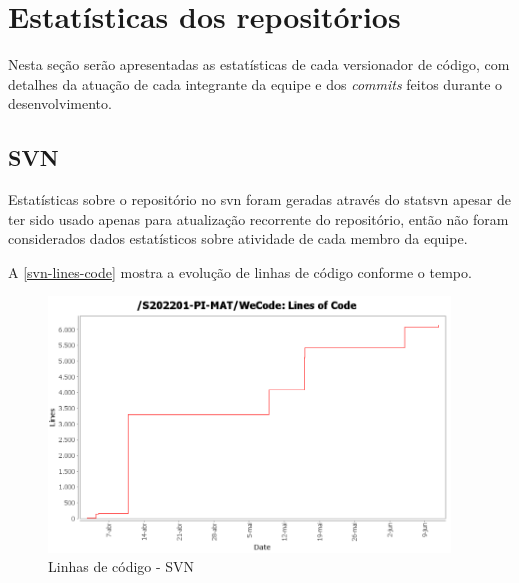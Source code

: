 \section{Estatísticas dos repositórios}
Nesta seção serão apresentadas as estatísticas de cada versionador de código, com detalhes da atuação de cada integrante da equipe e dos \emph{commits} feitos durante o desenvolvimento.

\subsection{SVN}
Estatísticas sobre o repositório no \gls{svn} foram geradas através do \gls{statsvn} apesar de ter sido usado apenas para atualização recorrente do repositório, então não foram considerados dados estatísticos sobre atividade de cada membro da equipe.

A \autoref{svn-lines-code} mostra a evolução de linhas de código conforme o tempo.
\begin{figure}[H]
	\centering
	\caption{\label{svn-lines-code}Linhas de código - SVN}
	\includegraphics[width=0.95\textwidth]{../imagens/stats/svn-lines-code.png}
\end{figure}

